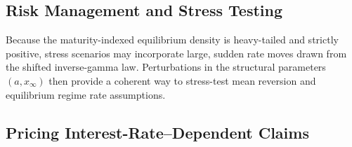 \documentclass[12pt]{article}
\theoremstyle{statementstyle}
\begin{document}
\subsection{Risk Management and Stress Testing}
\label{subsec:risk}

Because the maturity-indexed equilibrium density is heavy-tailed and strictly positive,
stress scenarios may incorporate large, sudden rate moves drawn from
the shifted inverse-gamma law. Perturbations in the structural
parameters $(a, x_{\infty})$ then provide a coherent way to stress-test
mean reversion and equilibrium regime rate assumptions.

\subsection{Pricing Interest-Rate--Dependent Claims}
\label{subsec:pricing}
\end{document}
